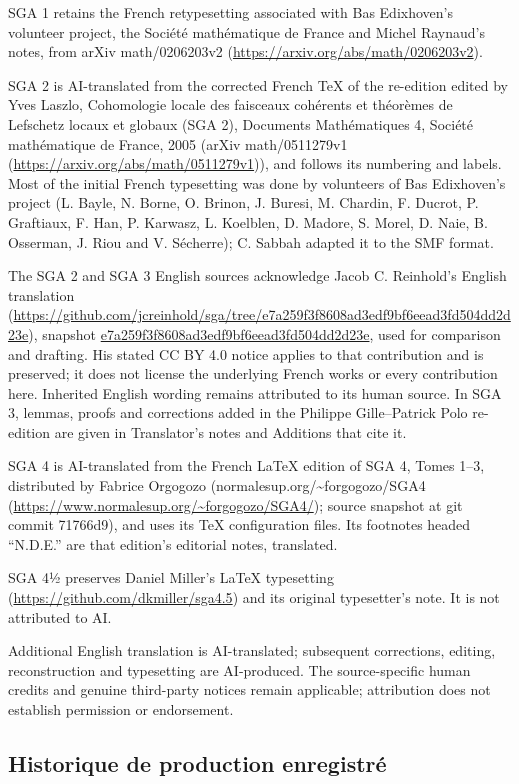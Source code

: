 SGA 1 retains the French retypesetting associated with Bas Edixhoven’s volunteer project, the Société mathématique de France and Michel Raynaud’s notes, from arXiv math/0206203v2 (\url{https://arxiv.org/abs/math/0206203v2}).

SGA 2 is AI-translated from the corrected French TeX of the re-edition edited by Yves Laszlo, Cohomologie locale des faisceaux cohérents et théorèmes de Lefschetz locaux et globaux (SGA 2), Documents Mathématiques 4, Société mathématique de France, 2005 (arXiv math/0511279v1 (\url{https://arxiv.org/abs/math/0511279v1})), and follows its numbering and labels. Most of the initial French typesetting was done by volunteers of Bas Edixhoven’s project (L. Bayle, N. Borne, O. Brinon, J. Buresi, M. Chardin, F. Ducrot, P. Graftiaux, F. Han, P. Karwasz, L. Koelblen, D. Madore, S. Morel, D. Naie, B. Osserman, J. Riou and V. Sécherre); C. Sabbah adapted it to the SMF format.

The SGA 2 and SGA 3 English sources acknowledge Jacob C. Reinhold’s English translation (\url{https://github.com/jcreinhold/sga/tree/e7a259f3f8608ad3edf9bf6eead3fd504dd2d23e}), snapshot \url{e7a259f3f8608ad3edf9bf6eead3fd504dd2d23e}, used for comparison and drafting. His stated CC BY 4.0 notice applies to that contribution and is preserved; it does not license the underlying French works or every contribution here. Inherited English wording remains attributed to its human source. In SGA 3, lemmas, proofs and corrections added in the Philippe Gille–Patrick Polo re-edition are given in Translator's notes and Additions that cite it.

SGA 4 is AI-translated from the French LaTeX edition of SGA 4, Tomes 1–3, distributed by Fabrice Orgogozo (normalesup.org/\textasciitilde{}forgogozo/SGA4 (\url{https://www.normalesup.org/~forgogozo/SGA4/}); source snapshot at git commit 71766d9), and uses its TeX configuration files. Its footnotes headed “N.D.E.” are that edition's editorial notes, translated.

SGA 4½ preserves Daniel Miller’s LaTeX typesetting (\url{https://github.com/dkmiller/sga4.5}) and its original typesetter’s note. It is not attributed to AI.

Additional English translation is AI-translated; subsequent corrections, editing, reconstruction and typesetting are AI-produced. The source-specific human credits and genuine third-party notices remain applicable; attribution does not establish permission or endorsement.


\subsection*{Historique de production enregistré}

